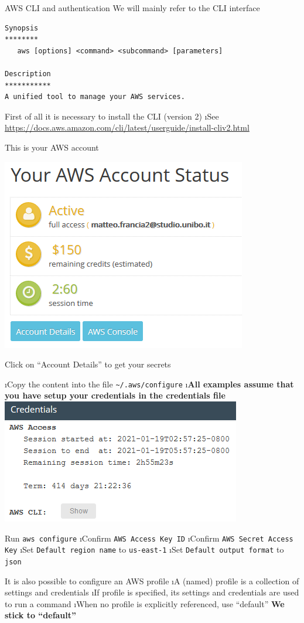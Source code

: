 \begin{frame}{AWS CLI and authentication}
We will mainly refer to the CLI interface
\begin{lstlisting}
Synopsis
********
   aws [options] <command> <subcommand> [parameters]

Description
***********
A unified tool to manage your AWS services.
\end{lstlisting}

First of all it is necessary to install the CLI (version 2)
\i See {\footnotesize \url{https://docs.aws.amazon.com/cli/latest/userguide/install-cliv2.html}}

\framebreak
This is your AWS account

\includegraphics[scale=.5]{imgs/aws_account.PNG}

\framebreak
Click on ``Account Details'' to get your secrets

\i Copy the content into the file \lstinline{~/.aws/configure}
\i \textbf{All examples assume that you have setup your credentials in the credentials file}
\includegraphics[scale=.5]{imgs/aws_account1.PNG}

\framebreak
Run \lstinline{aws configure}
\i Confirm \lstinline{AWS Access Key ID}
\i Confirm \lstinline{AWS Secret Access Key}
\i Set \lstinline{Default region name} to \lstinline{us-east-1}
\i Set \lstinline{Default output format} to \lstinline{json} 

It is also possible to configure an AWS profile
\i A (named) profile is a collection of settings and credentials
\i If profile is specified, its settings and credentials are used to run a command
\i When no profile is explicitly referenced, use ``default'' 
\si \textbf{We stick to ``default''}

\end{frame}

